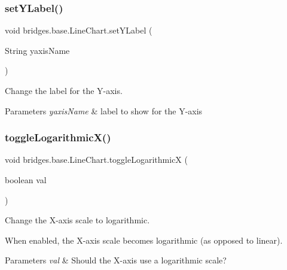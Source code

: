 \subsubsection{\texorpdfstring{set\+Y\+Label()}{setYLabel()}}
{\footnotesize\ttfamily void bridges.\+base.\+Line\+Chart.\+set\+Y\+Label (\begin{DoxyParamCaption}\item[{String}]{yaxis\+Name }\end{DoxyParamCaption})}



Change the label for the Y-\/axis. 


\begin{DoxyParams}{Parameters}
{\em yaxis\+Name} & label to show for the Y-\/axis \\
\hline
\end{DoxyParams}
\mbox{\label{classbridges_1_1base_1_1_line_chart_ad3e5e54c382ac605a81b6b61c250ad16}} 
\subsubsection{\texorpdfstring{toggle\+Logarithmic\+X()}{toggleLogarithmicX()}}
{\footnotesize\ttfamily void bridges.\+base.\+Line\+Chart.\+toggle\+LogarithmicX (\begin{DoxyParamCaption}\item[{boolean}]{val }\end{DoxyParamCaption})}



Change the X-\/axis scale to logarithmic. 

When enabled, the X-\/axis scale becomes logarithmic (as opposed to linear).


\begin{DoxyParams}{Parameters}
{\em val} & Should the X-\/axis use a logarithmic scale? \\
\hline
\end{DoxyParams}
\mbox{\label{classbridges_1_1base_1_1_line_chart_a7946f217a7b3567ee1a1bd8266ed43ca}} 
